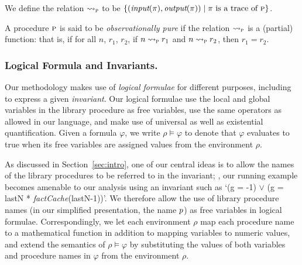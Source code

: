 

We define the relation $\rightsquigarrow_{\textsc{p}}$ to be $\{ (\textit{input}(\pi),\textit{output}(\pi)) \; | \; \pi \text{ is a trace of } \textsc{p} \}$.

\begin{definition}
\label{def:purity}
A procedure $\textsc{p}$ is said to be \emph{observationally pure} if the relation $\rightsquigarrow_{\textsc{p}}$ is a (partial) function:
that is, if for all $n$, $r_1$, $r_2$, if  $n \rightsquigarrow_{\textsc{p}} r_1$ and $n \rightsquigarrow_{\textsc{p}} r_2$, then $r_1 = r_2$.
\end{definition}

\subsubsection{Logical Formula and Invariants.}

Our methodology makes use of \emph{logical formulae} for different
purposes, including to express a given \emph{invariant}. 
Our logical formulae use the local and global variables in the library
procedure as free variables, use
the same operators as allowed in our language, and make use of universal as
well as existential quantification. 
Given a formula $\varphi$, 
we write $\rho \models \varphi$
to denote that $\varphi$ evaluates to true when its free variables are
assigned values from the environment $\rho$.

As discussed in Section~\ref{sec:intro},
one of our central ideas is to allow the names of the library procedures to
be referred to in the invariant; \eg, our running example becomes amenable
to our analysis using an invariant such as `(g = -1) $\vee$ (g = lastN *
\emph{factCache}(lastN-1))'.  We therefore allow the use of library
procedure names (in our simplified presentation, the name $p$) as free variables in
logical formulae. Correspondingly, 
we let each environment $\rho$ map each procedure name to a mathematical
function in addition to mapping variables to numeric values, and extend the
semantics of $\rho \models \varphi$ by substituting the values of both
variables and procedure names in $\varphi$ from the environment $\rho$. 



